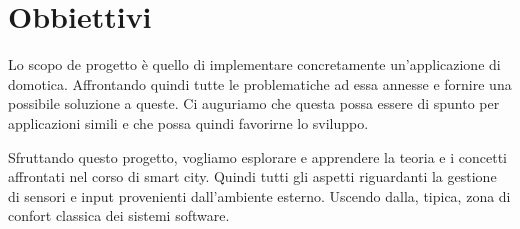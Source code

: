 \section{Obbiettivi}

Lo scopo de progetto è quello di implementare concretamente un'applicazione di domotica. Affrontando quindi tutte le problematiche ad essa annesse e fornire una possibile soluzione a queste. Ci auguriamo che questa possa essere di spunto per applicazioni simili e che possa quindi favorirne lo sviluppo.

Sfruttando questo progetto, vogliamo esplorare e apprendere la teoria e i concetti affrontati nel corso di smart city. Quindi tutti gli aspetti riguardanti la gestione di sensori e input provenienti dall'ambiente esterno. Uscendo dalla, tipica, zona di confort classica dei sistemi software.


\newpage


